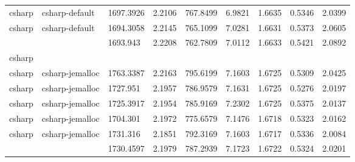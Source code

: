 \begin{longtable}[h]{|lllllllll|}
csharp         & csharp-default         & 1697.3926                 & 2.2106                                                               & 767.8499              & 6.9821           & 1.6635           & 0.5346       & 2.0399        \\
csharp         & csharp-default         & 1694.3058                 & 2.2145                                                               & 765.1099              & 7.0281           & 1.6631           & 0.5373       & 2.0605        \\
               &                        & 1693.943                  & 2.2208                                                               & 762.7809              & 7.0112           & 1.6633           & 0.5421       & 2.0892        \\
csharp         &                        &                           &                                                                      &                       &                  &                  &              &               \\
csharp         & csharp-jemalloc        & 1763.3387                 & 2.2163                                                               & 795.6199              & 7.1603           & 1.6725           & 0.5309       & 2.0425        \\
csharp         & csharp-jemalloc        & 1727.951                  & 2.1957                                                               & 786.9579              & 7.1631           & 1.6725           & 0.5276       & 2.0197        \\
csharp         & csharp-jemalloc        & 1725.3917                 & 2.1954                                                               & 785.9169              & 7.2302           & 1.6725           & 0.5375       & 2.0137        \\
csharp         & csharp-jemalloc        & 1704.301                  & 2.1972                                                               & 775.6579              & 7.1476           & 1.6718           & 0.5323       & 2.0162        \\
csharp         & csharp-jemalloc        & 1731.316                  & 2.1851                                                               & 792.3169              & 7.1603           & 1.6717           & 0.5336       & 2.0084        \\
               &                        & 1730.4597                 & 2.1979                                                               & 787.2939              & 7.1723           & 1.6722           & 0.5324       & 2.0201        \\

\end{longtable}
